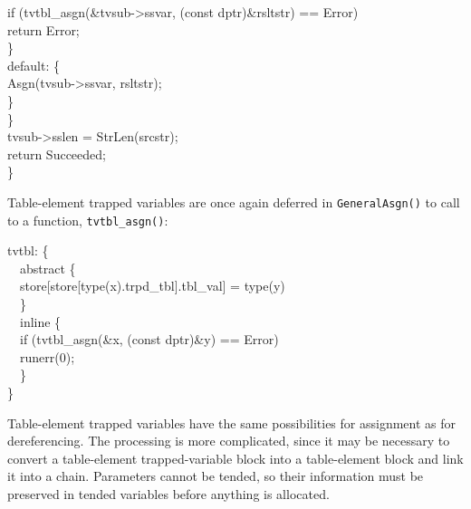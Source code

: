 \begin{iconcode}
\>\>\>if (tvtbl\_asgn(\&tvsub->ssvar, (const dptr)\&rsltstr) == Error)\\
\>\>\>\>return Error;\\
\>\>\>\}\\
\>\>default: \{\\
\>\>\>Asgn(tvsub->ssvar, rsltstr);\\
\>\>\>\}\\
\>\>\}\\
\>tvsub->sslen = StrLen(srcstr);\\
\>return Succeeded;\\
\>\}\\
\end{iconcode}

Table-element trapped variables are once again deferred in
\texttt{GeneralAsgn()} to call to a function, \texttt{tvtbl\_asgn()}:

\begin{iconcode}
\>\>tvtbl: \{\\
\>\>\ \ abstract \{\\
\>\>\>\ \ store[store[type(x).trpd\_tbl].tbl\_val] = type(y)\\
\>\>\>\ \ \}\\
\>\>\ \ inline \{\\
\>\>\>\ \ if (tvtbl\_asgn(\&x, (const dptr)\&y) == Error)\\
\>\>\>\>\ \ runerr(0);\\
\>\>\>\ \ \}\\
\>\>\>\}
\end{iconcode}

Table-element trapped variables have the same possibilities for
assignment as for dereferencing. The processing is more complicated,
since it may be necessary to convert a table-element trapped-variable
block into a table-element block and link it into a chain. Parameters
cannot be tended, so their information must be preserved in tended
variables before anything is allocated.

